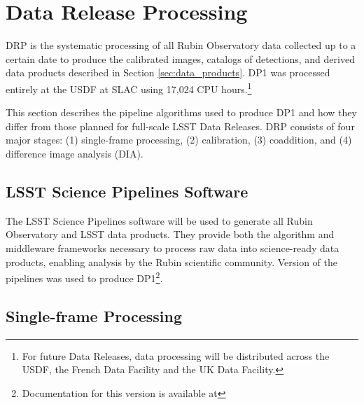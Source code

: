 \section{Data Release Processing}
\label{sec:drp}

\gls{DRP} is the systematic processing of all Rubin Observatory data collected up to a certain date to produce the calibrated images, catalogs of detections, and derived data products described in Section \ref{sec:data_products}.
\gls{DP1} was processed entirely at the \gls{USDF} at SLAC using 17,024 CPU hours.\footnote{For future Data Releases, data processing will be distributed across the USDF, the French Data Facility and the UK Data Facility.}

This section describes the pipeline algorithms used to produce \gls{DP1} and how they differ from those planned for full-scale LSST Data Releases.
\gls{DRP} consists of four major stages: (1) single-frame processing, (2) calibration, (3) coaddition, and (4) difference image analysis (DIA).

\subsection{LSST Science Pipelines Software}
\label{ssec:pipelines}
The  LSST Science Pipelines software \citep[][]{PSTN-019, LDM-151} will be used to generate all Rubin Observatory and LSST data products.
They provide both the \gls{algorithm} and \gls{middleware} frameworks necessary to process raw data into science-ready data products, enabling analysis by the Rubin scientific community.
Version \sciencepipelinesversion of the pipelines was used to produce \gls{DP1}\footnote{Documentation for this version is available at \sciencepipelinesurl}.

\subsection{Single-frame Processing}
\label{ssec:single_frame_processing}

